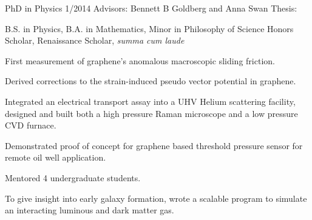 {\begin{singlespace}
\bigspace

{
	\newline
	PhD in Physics 1/2014\newline
	Advisors: Bennett B Goldberg and Anna Swan \newline
	Thesis: \thesistitlelower 

	\newline
	B.S. in Physics, B.A. in Mathematics, Minor in Philosophy of Science\newline
	Honors Scholar, Renaissance Scholar, \emph{summa cum laude}\newline
}


{
	\begin{description}[noitemsep,topsep=-5pt,labelindent=15pt]
	\item[Experiment:] First measurement of graphene's anomalous macroscopic sliding friction. 
	\item[Theory:] Derived corrections to the strain-induced pseudo vector potential in graphene.
	\item[Aperatus design:] Integrated an electrical transport assay into a UHV Helium scattering facility, designed and built both a high pressure Raman microscope and a low pressure CVD furnace.
	\item[Device:] Demonstrated proof of concept for graphene based threshold pressure sensor for remote oil well application.
	\item[Mentoring:] Mentored 4 undergraduate students.
	\end{description}
	\vspace{\sspace}

	 \newline
	To give insight into early galaxy formation, wrote a scalable program to simulate an interacting luminous and dark matter gas.
	 
}
\end{singlespace}}
